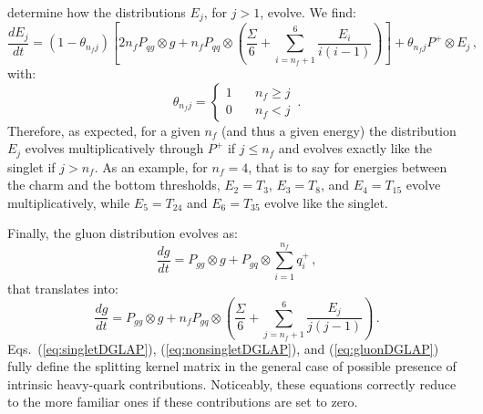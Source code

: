 \documentclass[10pt,a4paper]{article}
\begin{document}
determine how the distributions $E_j$, for $j>1$,
evolve. We find:
\begin{equation}\label{eq:nonsingletDGLAP}
  \frac{dE_j}{dt}= (1-\theta_{n_fj})\left[2n_f P_{qg}\otimes
    g+n_fP_{qq}\otimes
    \left(\frac{\Sigma}{6}+\sum_{i=n_f+1}^6\frac{E_i}{i(i-1)}\right)\right]+\theta_{n_fj}P^+\otimes
  E_j\,,
\end{equation}
with:
\begin{equation}
\theta_{n_fj}=\left\{
\begin{array}{ll}
1   & \quad n_f\geq j\\
0 & \quad n_f < j
\end{array}
\right.\,. 
\end{equation}
Therefore, as expected, for a given $n_f$ (and thus a given energy)
the distribution $E_j$ evolves multiplicatively through $P^+$ if
$j\leq n_f$ and evolves exactly like the singlet if $j>n_f$. As an
example, for $n_f=4$, that is to say for energies between the charm
and the bottom thresholds, $E_2=T_3$, $E_3=T_8$, and $E_4=T_{15}$
evolve multiplicatively, while $E_5=T_{24}$ and $E_6=T_{35}$ evolve
like the singlet.

Finally, the gluon distribution evolves as:
\begin{equation}
\frac{dg}{dt}= P_{gg}\otimes g+
P_{gq}\otimes \sum_{i=1}^{n_f} q_i^+\,,
\end{equation}
that translates into:
\begin{equation}\label{eq:gluonDGLAP}
\frac{dg}{dt}= P_{gg}\otimes g+n_fP_{gq}\otimes \left(\frac{\Sigma}{6}+\sum_{j=n_f+1}^6\frac{E_j}{j(j-1)}\right)\,.
\end{equation}
Eqs.~(\ref{eq:singletDGLAP}), (\ref{eq:nonsingletDGLAP}), and
(\ref{eq:gluonDGLAP}) fully define the splitting kernel matrix in the
general case of possible presence of intrinsic heavy-quark
contributions. Noticeably, these equations correctly reduce to the
more familiar ones if these contributions are set to zero.
\end{document}

